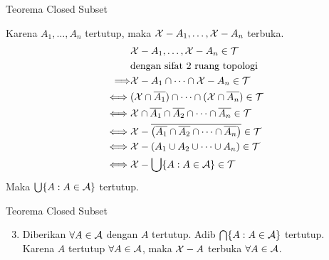 \begin{frame}{Teorema Closed Subset}
    \begin{tcolorbox}[enhanced,title=Teorema 1.18 (Bukti), frame style tile={width=\paperwidth}{\wallpaper}]
        Karena $A_1,\dots,A_n$ tertutup, maka $\nX-A_1,\dots,\nX-A_n$ terbuka.  
            \begin{align*}
                &\nX-A_1,\dots,\nX-A_n \in \nT\\
                &\text{dengan sifat 2 ruang topologi}\\
                \Longrightarrow&\nX-A_1\cap\dots\cap\nX-A_n \in \nT\\
                \iff&(\nX\cap \comp{A_1})\cap\dots\cap(\nX\cap \comp{A_n})\in \nT\\
                \iff&\nX\cap \comp{A_1}\cap \comp{A_2}\cap\dots\cap \comp{A_n}\in \nT\\
                \iff&\nX-\comp{\oio*{\comp{A_1}\cap \comp{A_2}\cap\dots\cap \comp{A_n}}}\in\nT\\
                \iff&\nX-\oio*{A_1\cup A_2\cup\dots\cup A_n}\in\nT\\
                \iff&\nX-\bigcup\{A:A\in\nA\}\in\nT
            \end{align*}
            Maka $\bigcup\{A:A\in\nA\}$ tertutup.
    \end{tcolorbox}
\end{frame}

\begin{frame}{Teorema Closed Subset}
    \begin{tcolorbox}[enhanced,title=Teorema 1.18 (Bukti), frame style tile={width=\paperwidth}{\wallpaper}]
        \begin{enumerate}
            \setcounter{enumi}{2}
            \item Diberikan $\forall A\in\nA$ dengan $A$ tertutup.
            Adib $\bigcap\{A:A\in\nA\}$ tertutup.\\
            Karena $A$ tertutup $\forall A \in \nA$, maka $\nX-A$ terbuka $\forall A\in \nA$.
        \end{enumerate}
    \end{tcolorbox}
\end{frame}

